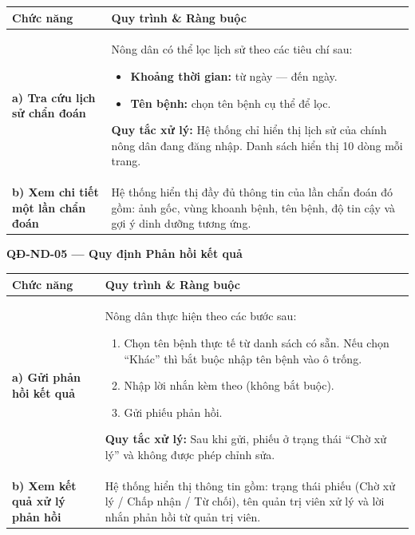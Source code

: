 \documentclass[12pt,a4paper]{article}
\begin{document}
\begin{longtable}{|
        >{\raggedright\arraybackslash}p{2.8cm}|
        >{\raggedright\arraybackslash}p{12cm}|}
    \hline
    \rowcolor{headerblue}
    \textbf{Chức năng}                         & \textbf{Quy trình \& Ràng buộc}                                                                \\
    \hline
    \endhead
    \textbf{a) Tra cứu lịch sử chẩn đoán}      &
    Nông dân có thể lọc lịch sử theo các tiêu chí sau:
    \begin{itemize}[leftmargin=*,topsep=2pt,itemsep=1pt]
        \item \textbf{Khoảng thời gian:} từ ngày --- đến ngày.
        \item \textbf{Tên bệnh:} chọn tên bệnh cụ thể để lọc.
    \end{itemize}
    \textbf{Quy tắc xử lý:} Hệ thống chỉ hiển thị lịch sử của chính nông dân đang đăng nhập. Danh sách hiển thị 10 dòng mỗi trang.              \\
    \hline
    \textbf{b) Xem chi tiết một lần chẩn đoán} &
    Hệ thống hiển thị đầy đủ thông tin của lần chẩn đoán đó gồm: ảnh gốc, vùng khoanh bệnh, tên bệnh, độ tin cậy và gợi ý dinh dưỡng tương ứng. \\
    \hline
\end{longtable}

\vspace{0.3cm}
\noindent\textbf{QĐ-ND-05 --- Quy định Phản hồi kết quả}

\begin{longtable}{|
        >{\raggedright\arraybackslash}p{2.8cm}|
        >{\raggedright\arraybackslash}p{12cm}|}
    \hline
    \rowcolor{headerblue}
    \textbf{Chức năng}                     & \textbf{Quy trình \& Ràng buộc}                                                                            \\
    \hline
    \endhead
    \textbf{a) Gửi phản hồi kết quả}       &
    Nông dân thực hiện theo các bước sau:
    \begin{enumerate}[leftmargin=*,topsep=2pt,itemsep=1pt]
        \item Chọn tên bệnh thực tế từ danh sách có sẵn. Nếu chọn ``Khác'' thì bắt buộc nhập tên bệnh vào ô trống.
        \item Nhập lời nhắn kèm theo (không bắt buộc).
        \item Gửi phiếu phản hồi.
    \end{enumerate}
    \textbf{Quy tắc xử lý:} Sau khi gửi, phiếu ở trạng thái ``Chờ xử lý'' và không được phép chỉnh sửa.                                                 \\
    \hline
    \textbf{b) Xem kết quả xử lý phản hồi} &
    Hệ thống hiển thị thông tin gồm: trạng thái phiếu (Chờ xử lý / Chấp nhận / Từ chối), tên quản trị viên xử lý và lời nhắn phản hồi từ quản trị viên. \\
    \hline
\end{longtable}
\end{document}
